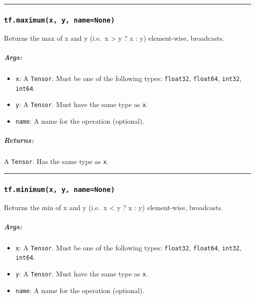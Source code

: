 \begin{center}\rule{0.5\linewidth}{\linethickness}\end{center}

\subsubsection{\texorpdfstring{\texttt{tf.maximum(x,\ y,\ name=None)}
}{tf.maximum(x, y, name=None) }}\label{tf.maximumx-y-namenone}

Returns the max of x and y (i.e.~x \textgreater{} y ? x : y)
element-wise, broadcasts.

\subparagraph{Args: }\label{args-19}

\begin{itemize}
\tightlist
\item
  \texttt{x}: A \texttt{Tensor}. Must be one of the following types:
  \texttt{float32}, \texttt{float64}, \texttt{int32}, \texttt{int64}.
\item
  \texttt{y}: A \texttt{Tensor}. Must have the same type as \texttt{x}.
\item
  \texttt{name}: A name for the operation (optional).
\end{itemize}

\subparagraph{Returns: }\label{returns-19}

A \texttt{Tensor}. Has the same type as \texttt{x}.

\begin{center}\rule{0.5\linewidth}{\linethickness}\end{center}

\subsubsection{\texorpdfstring{\texttt{tf.minimum(x,\ y,\ name=None)}
}{tf.minimum(x, y, name=None) }}\label{tf.minimumx-y-namenone}

Returns the min of x and y (i.e.~x \textless{} y ? x : y) element-wise,
broadcasts.

\subparagraph{Args: }\label{args-20}

\begin{itemize}
\tightlist
\item
  \texttt{x}: A \texttt{Tensor}. Must be one of the following types:
  \texttt{float32}, \texttt{float64}, \texttt{int32}, \texttt{int64}.
\item
  \texttt{y}: A \texttt{Tensor}. Must have the same type as \texttt{x}.
\item
  \texttt{name}: A name for the operation (optional).
\end{itemize}

